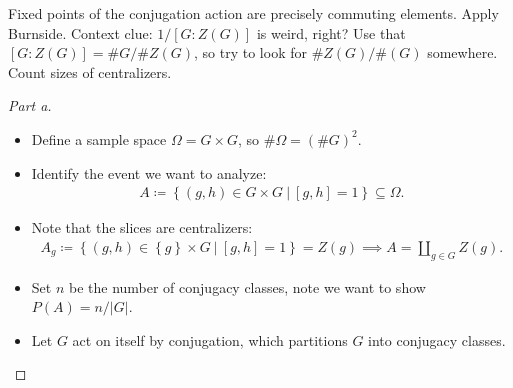 \begin{strategy}

Fixed points of the conjugation action are precisely commuting elements.
Apply Burnside. Context clue: \(1/[G:Z(G)]\) is weird, right? Use that
\([G:Z(G)] = \# G/\# Z(G)\), so try to look for \(\#Z(G)/\#(G)\)
somewhere. Count sizes of centralizers.

\end{strategy}

\begin{solution}

\envlist

\begin{proof}[Part a]

\envlist

\begin{itemize}
\item
  Define a sample space \(\Omega = G \times G\), so
  \(\# {\Omega} = (\# {G})^2\).
\item
  Identify the event we want to analyze:
  \begin{align*}
  A \coloneqq\left\{{(g,h) \in G\times G {~\mathrel{\Big|}~}[g,h] = 1}\right\} \subseteq \Omega
  .\end{align*}
\item
  Note that the slices are centralizers:
  \begin{align*}
  A_g \coloneqq\left\{{(g, h) \in \left\{{ g }\right\} \times G {~\mathrel{\Big|}~}[g, h] = 1}\right\} = Z(g) \implies A = \displaystyle\coprod_{g\in G} Z(g)
  .\end{align*}
\item
  Set \(n\) be the number of conjugacy classes, note we want to show
  \(P(A) = n / {\left\lvert {G} \right\rvert}\).
\item
  Let \(G\) act on itself by conjugation, which partitions \(G\) into
  conjugacy classes.


\end{itemize}
\end{proof}
\end{solution}
